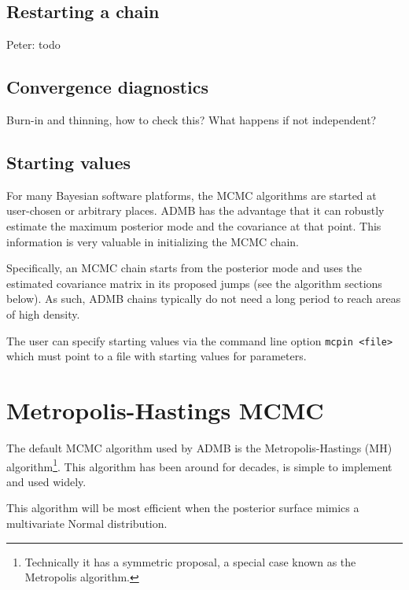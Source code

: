 \documentclass{article}\usepackage[]{graphicx}\usepackage[]{color}
\begin{document}
\subsection{Restarting a chain}\label{sec:restart}
Peter: todo
\subsection{Convergence diagnostics} \label{sec:diag}
Burn-in and thinning, how to check this? What happens if not
independent?
\subsection{Starting values}\label{sec:startvals}
For many Bayesian software platforms, the MCMC algorithms
are started at user-chosen or arbitrary places. ADMB has the
advantage that it can robustly estimate the maximum
posterior mode and the covariance at that point. This
information is very valuable in initializing the MCMC chain.

Specifically, an MCMC chain starts from the posterior mode
and uses the estimated covariance matrix in its proposed
jumps (see the algorithm sections below). As such, ADMB
chains typically do not need a long period to reach areas of
high density.

The user can specify starting values via the command line
option \texttt{mcpin <file>} which must point to a file with
starting values for parameters.

\section{Metropolis-Hastings MCMC}\label{sec:MH}
The default MCMC algorithm used by ADMB is the
Metropolis-Hastings (MH) algorithm\footnote{Technically it
  has a symmetric proposal, a special case known as the
  Metropolis algorithm.}. This algorithm has been around for
decades, is simple to implement and used widely.

This algorithm will be most efficient when the posterior
surface mimics a multivariate Normal distribution.
\end{document}
